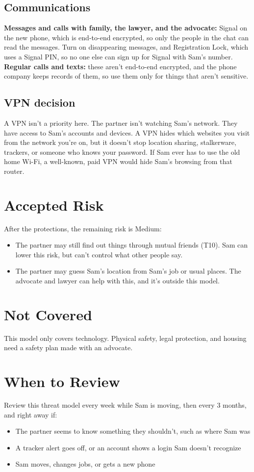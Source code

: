 \documentclass[11pt]{article}
\begin{document}
\subsection*{Communications}
\textbf{Messages and calls with family, the lawyer, and the advocate:} Signal on the new phone, which is end-to-end encrypted, so only the people in the chat can read the messages. Turn on disappearing messages, and Registration Lock, which uses a Signal PIN, so no one else can sign up for Signal with Sam's number. \textbf{Regular calls and texts:} these aren't end-to-end encrypted, and the phone company keeps records of them, so use them only for things that aren't sensitive.

\subsection*{VPN decision}
A VPN isn't a priority here. The partner isn't watching Sam's network. They have access to Sam's accounts and devices. A VPN hides which websites you visit from the network you're on, but it doesn't stop location sharing, stalkerware, trackers, or someone who knows your password. If Sam ever has to use the old home Wi-Fi, a well-known, paid VPN would hide Sam's browsing from that router.

\section{Accepted Risk}
After the protections, the remaining risk is Medium:
\begin{itemize}
    \item The partner may still find out things through mutual friends (T10). Sam can lower this risk, but can't control what other people say.
    \item The partner may guess Sam's location from Sam's job or usual places. The advocate and lawyer can help with this, and it's outside this model.
\end{itemize}

\section{Not Covered}
This model only covers technology. Physical safety, legal protection, and housing need a safety plan made with an advocate.

\section{When to Review}
Review this threat model every week while Sam is moving, then every 3 months, and right away if:
\begin{itemize}
    \item The partner seems to know something they shouldn't, such as where Sam was
    \item A tracker alert goes off, or an account shows a login Sam doesn't recognize
    \item Sam moves, changes jobs, or gets a new phone
\end{itemize}
\end{document}
